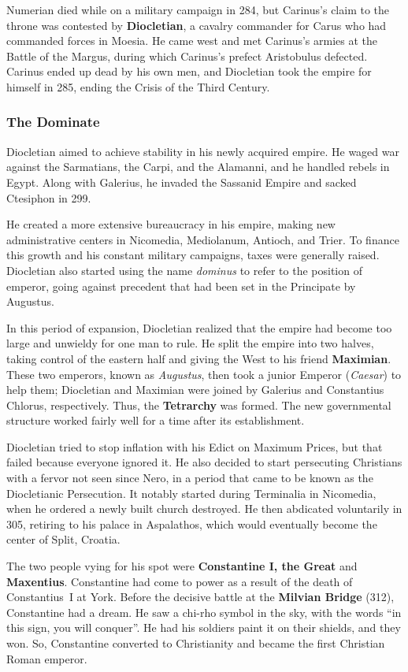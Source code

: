 Numerian died while on a military campaign in 284,
but Carinus's claim to the throne was contested by \textbf{Diocletian},
a cavalry commander for Carus who had commanded forces in Moesia.
He came west and met Carinus's armies at the Battle of the Margus,
during which Carinus's prefect Aristobulus defected.
Carinus ended up dead by his own men,
and Diocletian took the empire for himself in 285,
ending the Crisis of the Third Century.

\subsubsection*{The Dominate}

Diocletian aimed to achieve stability in his newly acquired empire.
He waged war against the Sarmatians, the Carpi, and the Alamanni,
and he handled rebels in Egypt.
Along with Galerius, he invaded the Sassanid Empire and sacked Ctesiphon in 299.

He created a more extensive bureaucracy in his empire,
making new administrative centers in Nicomedia, Mediolanum, Antioch, and Trier.
To finance this growth and his constant military campaigns,
taxes were generally raised.
Diocletian also started using the name \textit{dominus} to refer to the position of emperor,
going against precedent that had been set in the Principate by Augustus.

In this period of expansion,
Diocletian realized that the empire had become too large and unwieldy for one man to rule.
He split the empire into two halves,
taking control of the eastern half and giving the West to his friend \textbf{Maximian}.
These two emperors, known as \textit{Augustus},
then took a junior Emperor (\textit{Caesar}) to help them;
Diocletian and Maximian were joined by Galerius and Constantius Chlorus, respectively.
Thus, the \textbf{Tetrarchy} was formed.
The new governmental structure worked fairly well for a time after its establishment.

Diocletian tried to stop inflation with his Edict on Maximum Prices,
but that failed because everyone ignored it.
He also decided to start persecuting Christians with a fervor not seen since Nero,
in a period that came to be known as the Diocletianic Persecution.
It notably started during Terminalia in Nicomedia,
when he ordered a newly built church destroyed.
He then abdicated voluntarily in 305,
retiring to his palace in Aspalathos, which would eventually become the center of Split, Croatia.

The two people vying for his spot were \textbf{Constantine I, the Great} and \textbf{Maxentius}.
Constantine had come to power as a result of the death of Constantius~I at York.
Before the decisive battle at the \textbf{Milvian Bridge} (312), Constantine had a dream.
He saw a chi-rho symbol in the sky, with the words ``in this sign, you will conquer''.
He had his soldiers paint it on their shields, and they won.
So, Constantine converted to Christianity and became the first Christian Roman emperor.

